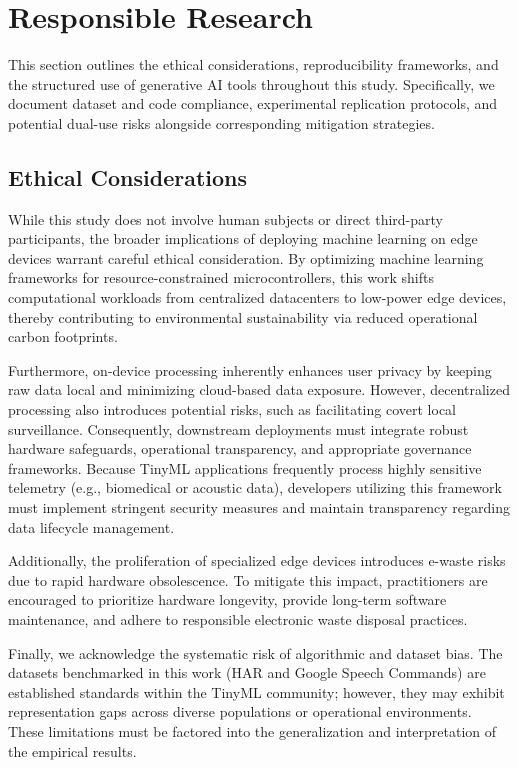 \section{Responsible Research}
\label{sec:responsible_research}

This section outlines the ethical considerations, reproducibility frameworks, and the structured use of generative AI tools throughout this study. Specifically, we document dataset and code compliance, experimental replication protocols, and potential dual-use risks alongside corresponding mitigation strategies.

\subsection{Ethical Considerations}

While this study does not involve human subjects or direct third-party participants, the broader implications of deploying machine learning on edge devices warrant careful ethical consideration. By optimizing machine learning frameworks for resource-constrained microcontrollers, this work shifts computational workloads from centralized datacenters to low-power edge devices, thereby contributing to environmental sustainability via reduced operational carbon footprints.

Furthermore, on-device processing inherently enhances user privacy by keeping raw data local and minimizing cloud-based data exposure. However, decentralized processing also introduces potential risks, such as facilitating covert local surveillance. Consequently, downstream deployments must integrate robust hardware safeguards, operational transparency, and appropriate governance frameworks. Because TinyML applications frequently process highly sensitive telemetry (e.g., biomedical or acoustic data), developers utilizing this framework must implement stringent security measures and maintain transparency regarding data lifecycle management.

Additionally, the proliferation of specialized edge devices introduces e-waste risks due to rapid hardware obsolescence. To mitigate this impact, practitioners are encouraged to prioritize hardware longevity, provide long-term software maintenance, and adhere to responsible electronic waste disposal practices.

Finally, we acknowledge the systematic risk of algorithmic and dataset bias. The datasets benchmarked in this work (HAR and Google Speech Commands) are established standards within the TinyML community; however, they may exhibit representation gaps across diverse populations or operational environments. These limitations must be factored into the generalization and interpretation of the empirical results.

